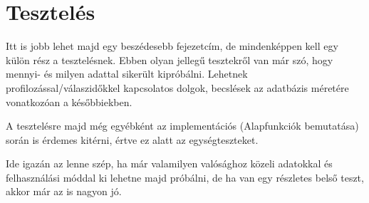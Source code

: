 \chapter{Tesztelés}

Itt is jobb lehet majd egy beszédesebb fejezetcím, de mindenképpen kell egy külön rész a tesztelésnek. Ebben olyan jellegű tesztekről van már szó, hogy mennyi- és milyen adattal sikerült kipróbálni. Lehetnek profilozással/válaszidőkkel kapcsolatos dolgok, becslések az adatbázis méretére vonatkozóan a későbbiekben.

A tesztelésre majd még egyébként az implementációs (Alapfunkciók bemutatása) során is érdemes kitérni, értve ez alatt az egységteszteket.

Ide igazán az lenne szép, ha már valamilyen valósághoz közeli adatokkal és felhasználási móddal ki lehetne majd próbálni, de ha van egy részletes belső teszt, akkor már az is nagyon jó.
